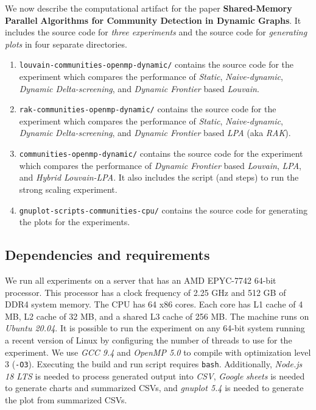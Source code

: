 We now describe the computational artifact for the paper \textbf{Shared-Memory Parallel} \textbf{Algorithms for Community Detection in Dynamic Graphs}. It includes the source code for \textit{three experiments} and the source code for \textit{generating plots} in four separate directories.

\begin{enumerate}
\def\labelenumi{\arabic{enumi}.}
\item
  \texttt{louvain-communities-openmp-dynamic/} contains the source code for the experiment which compares the performance of \textit{Static}, \textit{Naive-dynamic}, \textit{Dynamic Delta-screening}, and \textit{Dynamic Frontier} based \textit{Louvain}.
\item
  \texttt{rak-communities-openmp-dynamic/} contains the source code for the experiment which compares the performance of \textit{Static}, \textit{Naive-dynamic}, \textit{Dynamic} \textit{Delta-screening}, and \textit{Dynamic Frontier} based \textit{LPA} (aka \textit{RAK}).
\item
  \texttt{communities-openmp-dynamic/} contains the source code for the experiment which compares the performance of \textit{Dynamic Frontier} based \textit{Louvain}, \textit{LPA}, and \textit{Hybrid Louvain-LPA}. It also includes the script (and steps) to run the strong scaling experiment.
\item
  \texttt{gnuplot-scripts-communities-cpu/} contains the source code for generating the plots for the experiments.
\end{enumerate}




\subsection{Dependencies and requirements}

We run all experiments on a server that has an AMD EPYC-7742 64-bit processor. This processor has a clock frequency of 2.25 GHz and 512 GB of DDR4 system memory. The CPU has 64 x86 cores. Each core has L1 cache of 4 MB, L2 cache of 32 MB, and a shared L3 cache of 256 MB. The machine runs on \textit{Ubuntu 20.04}. It is possible to run the experiment on any 64-bit system running a recent version of Linux by configuring the number of threads to use for the experiment. We use \textit{GCC 9.4} and \textit{OpenMP 5.0} to compile with optimization level 3 (\texttt{-O3}). Executing the build and run script requires \texttt{bash}. Additionally, \textit{Node.js 18 LTS} is needed to process generated output into \textit{CSV}, \textit{Google} \textit{sheets} is needed to generate charts and summarized CSVs, and \textit{gnuplot 5.4} is needed to generate the plot from summarized CSVs.

